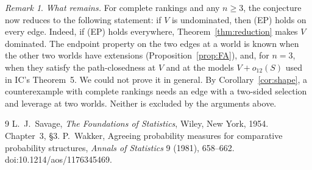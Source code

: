 \documentclass[11pt]{article}
\theoremstyle{definition}\newtheorem{definition}[theorem]{Definition}
\theoremstyle{remark}\newtheorem{remark}[theorem]{Remark}
\begin{document}
\begin{remark}\label{rem:open}
\emph{What remains.} For complete rankings and any $n\ge3$, the conjecture
now reduces to the following statement: if $V$ is undominated, then (EP)
holds on every edge. Indeed, if (EP) holds everywhere,
Theorem~\ref{thm:reduction} makes $V$ dominated. The endpoint property on the
two edges at a world is known when the other two worlds have extensions
(Proposition~\ref{prop:FA}), and, for $n=3$, when they satisfy the
path-closedness at $V$ and at the models $V+o_{12}(S)$ used in IC's
Theorem~5. We could not prove it in general. By
Corollary~\ref{cor:shape}, a counterexample with complete rankings needs an
edge with a two-sided selection and leverage at two worlds. Neither is
excluded by the arguments above.
\end{remark}

\begin{thebibliography}{9}
 L.~J.~Savage, \emph{The Foundations of Statistics}, Wiley,
New York, 1954. Chapter~3, \S3.
 P.~Wakker, Agreeing probability measures for comparative
probability structures, \emph{Annals of Statistics} 9 (1981), 658--662.
doi:10.1214/aos/1176345469.
\end{thebibliography}
\end{document}
